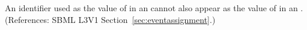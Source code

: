 An identifier used as the value of  in an \EventAssignment
cannot also appear as the value of  in an \AssignmentRule.
(References: SBML L3V1 Section~\ref{sec:eventassignment}.)
